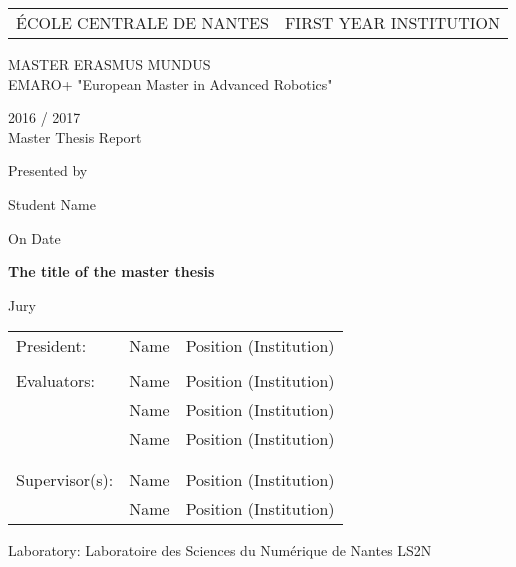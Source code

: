 \thispagestyle{empty}

\def\lskip{\vspace{0.5cm}}


\begin{tabular}{p{7cm}p{8cm}}
ÉCOLE CENTRALE DE NANTES
&
\raggedleft FIRST YEAR INSTITUTION	%
\end{tabular}

\vspace{2cm}


\begin{center} \large\sc MASTER ERASMUS MUNDUS \\ \normalsize{EMARO+ "European Master in Advanced Robotics"} \end{center}


\begin{center}
	2016 / 2017\\
	\lskip
	Master Thesis Report
	\lskip
	
	Presented by \lskip 
	
	Student Name \lskip
	
	On Date \lskip\lskip
	
	{\Large \textbf{The title of the master thesis}}
	
	\vfill

Jury \lskip
		
	\end{center}
	


\begin{tabular}{p{3cm}p{7cm}p{5cm} }
 President: & Name & Position (Institution) \\ & & \\ 
 Evaluators: & Name & Position (Institution) \\
	      & Name & Position (Institution) \\ 
	      & Name & Position (Institution) \\ & & \\  & & \\ 
  Supervisor(s):  & Name & Position (Institution) \\
		  & Name & Position (Institution) 
\end{tabular}

\lskip

\begin{flushleft}
 Laboratory: Laboratoire des Sciences du Numérique de Nantes LS2N
\end{flushleft}

\newpage
\thispagestyle{empty}
\null
\newpage
\addtocounter{page}{-1}
\pagestyle{fancy}
